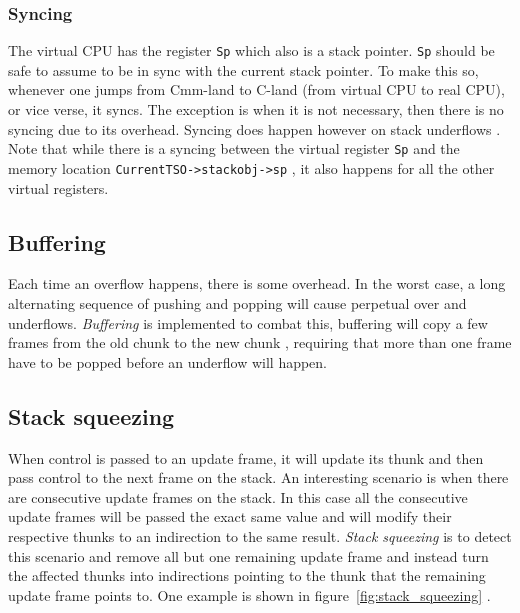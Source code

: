 \subsubsection{Syncing}

The virtual CPU has the register \texttt{Sp} which also is a stack
pointer. \texttt{Sp} should be safe to assume to be in sync with
the current stack pointer. To make this so, whenever one jumps
from Cmm-land to C-land (from virtual CPU to real CPU), or vice
verse, it syncs. The exception is when it is not necessary, then there
is no syncing due to its overhead. Syncing does happen however on stack
underflows \cite{github_underflow_frame}. Note that while there is a
syncing between the virtual register \texttt{Sp} and the memory location
\texttt{CurrentTSO->stackobj->sp} \cite{github_sync_sp}, it also happens
for all the other virtual registers.

\subsection{Buffering}

Each time an overflow happens, there is some overhead. In the worst
case, a long alternating sequence of pushing and popping will cause
perpetual over and underflows. \emph{Buffering} is implemented to combat this,
buffering will copy a few frames from the old chunk to the new chunk
\cite{github_stack_buffering}, requiring that more than one frame have
to be popped before an underflow will happen.

\subsection{Stack squeezing}

When control is passed to an update frame, it will update its thunk and
then pass control to the next frame on the stack. An interesting scenario
is when there are consecutive update frames on the stack. In this case
all the consecutive update frames will be passed the exact same value
and will modify their respective thunks to an indirection to the same result.
\emph{Stack squeezing}
is to detect this scenario and remove all but one remaining update frame
and instead turn the affected thunks into indirections pointing to the
thunk that the remaining update frame points to. One example
is shown in figure~\ref{fig:stack_squeezing} \cite{github_thread_paused}.

